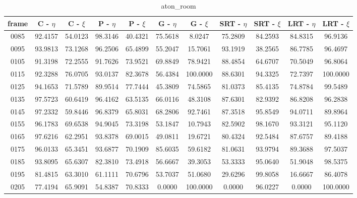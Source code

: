 \begin{appendices}
\begin{table}
\centering
\caption{aton\_room}
\begin{tabular}{ |c|c|c|c|c|c|c|c|c|c|c| }
	\hline
\textbf{frame} &  \textbf{C - $\eta$} &  \textbf{C - $\xi$} &  \textbf{P - $\eta$} &  \textbf{P - $\xi$} &  \textbf{G - $\eta$} &  \textbf{G - $\xi$} &  \textbf{SRT - $\eta$} &  \textbf{SRT - $\xi$} &  \textbf{LRT - $\eta$} &  \textbf{LRT - $\xi$} \\
\hline
\hline
0085 &  92.4157 &  54.0123 &   98.3146 &  40.4321 &   75.5618 &  8.0247 &   75.2809 &  84.2593 &   84.8315 &  96.9136    \\
\hline
0095 &  93.9813 &  73.1268 &   96.2506 &  65.4899 &   55.2047 &  15.7061 &   93.1919 &  38.2565 &   86.7785 &  96.4697    \\
\hline
0105 &  91.3198 &  72.2555 &   91.7626 &  73.9521 &   69.8849 &  78.9421 &   88.4854 &  64.6707 &   70.5049 &  96.8064    \\
\hline
0115 &  92.3288 &  76.0705 &   93.0137 &  82.3678 &   56.4384 &  100.0000 &   88.6301 &  94.3325 &   72.7397 &  100.0000    \\
\hline
0125 &  94.1653 &  71.5789 &   89.9514 &  77.7444 &   45.3809 &  74.5865 &   81.0373 &  85.4135 &   74.8784 &  99.5489    \\
\hline
0135 &  97.5723 &  60.6419 &   96.4162 &  63.5135 &   66.0116 &  48.3108 &   87.6301 &  82.9392 &   86.8208 &  96.2838    \\
\hline
0145 &  97.2332 &  59.8446 &   96.8379 &  65.8031 &   68.2806 &  92.7461 &   87.3518 &  95.8549 &   94.0711 &  89.8964    \\
\hline
0155 &  96.1783 &  69.6538 &   94.9045 &  73.3198 &   53.1847 &  10.7943 &   82.5902 &  98.1670 &   93.3121 &  95.1120    \\
\hline
0165 &  97.6216 &  62.2951 &   93.8378 &  69.0015 &   49.0811 &  19.6721 &   80.4324 &  92.5484 &   87.6757 &  89.4188    \\
\hline
0175 &  96.0133 &  65.3451 &   93.6877 &  70.1909 &   85.6035 &  59.6182 &   81.0631 &  93.9794 &   89.3688 &  97.5037    \\
\hline
0185 &  93.8095 &  65.6307 &   82.3810 &  73.4918 &   56.6667 &  39.3053 &   53.3333 &  95.0640 &   51.9048 &  98.5375    \\
\hline
0195 &  81.4815 &  63.3010 &   61.1111 &  70.6796 &   53.7037 &  51.0680 &   29.6296 &  99.8058 &   16.6667 &  86.4078    \\
\hline
0205 &  77.4194 &  65.9091 &   54.8387 &  70.8333 &   0.0000 &  100.0000 &   0.0000 &  96.0227 &   0.0000 &  100.0000    \\

\end{tabular}
\end{table}
\end{appendices}
